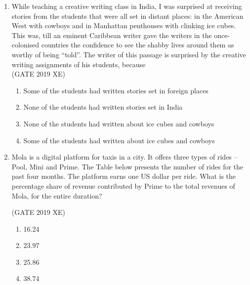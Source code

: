 \documentclass[journal,12pt,onecolumn]{IEEEtran}
\begin{document}
\begin{enumerate}
\hfill{(GATE 2019 XE)} 
\begin{multicols}{2}
\begin{enumerate}
\item 13.50
\item 14.50
\item 15.50
\item 16.50
\end{enumerate}
\end{multicols}

\item While teaching a creative writing class in India, I was surprised at receiving stories from the students that were all set in distant places: in the American West with cowboys and in Manhattan penthouses with clinking ice cubes. This was, till an eminent Caribbean writer gave the writers in the once-colonised countries the confidence to see the shabby lives around them as worthy of being ``told''. The writer of this passage is surprised by the creative writing assignments of his students, because\\
\hfill{(GATE 2019 XE)} 
\begin{multicols}{2}
\begin{enumerate}
\item Some of the students had written stories set in foreign places
\item None of the students had written stories set in India
\item None of the students had written about ice cubes and cowboys
\item Some of the students had written about ice cubes and cowboys
\end{enumerate}
\end{multicols}

\item Mola is a digital platform for taxis in a city. It offers three types of rides -- Pool, Mini and Prime. The Table below presents the number of rides for the past four months. The platform earns one US dollar per ride. What is the percentage share of revenue contributed by Prime to the total revenues of Mola, for the entire duration?




\hfill{(GATE 2019 XE)} 
\begin{multicols}{2}
\begin{enumerate}
\item 16.24
\item 23.97
\item 25.86
\item 38.74
\end{enumerate}
\end{multicols}


\end{enumerate}
\end{document}
